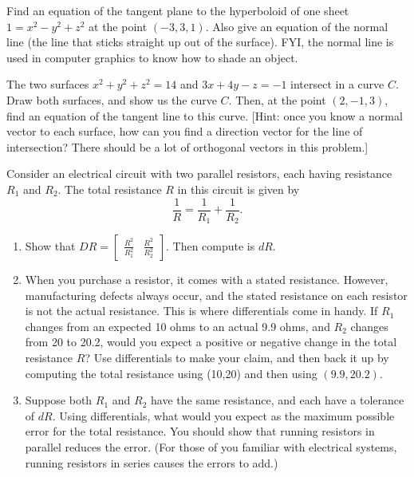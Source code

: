 \begin{problem}
 Find an equation of the tangent plane to the hyperboloid of one sheet $1=x^2-y^2+z^2$ at the point $(-3,3,1)$. Also give an equation of the normal line (the line that sticks straight up out of the surface).  FYI, the normal line is used in computer graphics to know how to shade an object.  
\end{problem}

\begin{problem}
 The two surfaces $x^2+y^2+z^2=14$ and $3x+4y-z=-1$ intersect in a curve $C$. Draw both surfaces, and show us the curve $C$. Then, at the point $(2,-1,3)$, find an equation of the tangent line to this curve. [Hint: once you know a normal vector to each surface, how can you find a direction vector for the line of intersection? There should be a lot of orthogonal vectors in this problem.]
\end{problem}

\begin{problem}
Consider an electrical circuit with two parallel resistors, each having resistance {$R_1$} and {$R_2$}. The total resistance $R$ in this circuit is given by  $$\frac{1}{R} = \frac{1}{R_1}+\frac{1}{R_2}.$$
\begin{enumerate}
  \item Show that $DR = \begin{bmatrix}\frac{R^2}{R_1^2} & \frac{R^2}{R_2^2} \end{bmatrix}$. Then compute is $dR$.
  \item When you purchase a resistor, it comes with a stated resistance.  However, manufacturing defects always occur, and the stated resistance on each resistor is not the actual resistance.  This is where differentials come in handy. 
  If {$ R_1 $} changes from an expected 10 ohms to an actual 9.9 ohms, and {$ R_2 $} changes from 20 to 20.2, would you expect a positive or negative change in the total resistance {$R$}? Use differentials to make your claim, and then back it up by computing the total resistance using (10,20) and then using $(9.9,20.2)$.
  \item Suppose both $R_1$ and $R_2$ have the same resistance, and each have a tolerance of $dR$.  Using differentials, what would you expect as the maximum possible error for the total resistance.  You should show that running resistors in parallel reduces the error. (For those of you familiar with electrical systems, running resistors in series causes the errors to add.)
\end{enumerate}
\end{problem}


